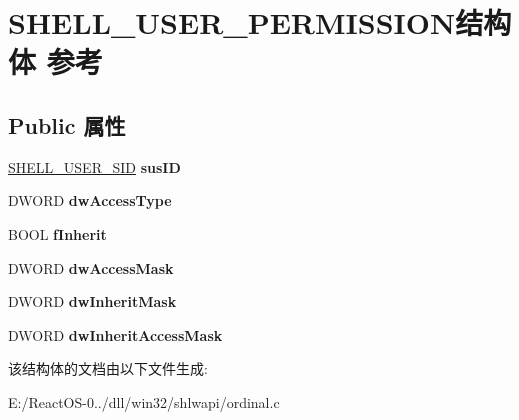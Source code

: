 \hypertarget{struct_s_h_e_l_l___u_s_e_r___p_e_r_m_i_s_s_i_o_n}{}\section{S\+H\+E\+L\+L\+\_\+\+U\+S\+E\+R\+\_\+\+P\+E\+R\+M\+I\+S\+S\+I\+O\+N结构体 参考}
\label{struct_s_h_e_l_l___u_s_e_r___p_e_r_m_i_s_s_i_o_n}
\subsection*{Public 属性}
\begin{DoxyCompactItemize}
\item 
\mbox{\label{struct_s_h_e_l_l___u_s_e_r___p_e_r_m_i_s_s_i_o_n_a40a6002cd78f67492c8f1269f8272184}} 
\hyperlink{struct_s_h_e_l_l___u_s_e_r___s_i_d}{S\+H\+E\+L\+L\+\_\+\+U\+S\+E\+R\+\_\+\+S\+ID} {\bfseries sus\+ID}
\item 
\mbox{\label{struct_s_h_e_l_l___u_s_e_r___p_e_r_m_i_s_s_i_o_n_a944d0acaee97feff1475881ed6fecabb}} 
D\+W\+O\+RD {\bfseries dw\+Access\+Type}
\item 
\mbox{\label{struct_s_h_e_l_l___u_s_e_r___p_e_r_m_i_s_s_i_o_n_ab6aa5de573f3476bb0657e1de87b7cfe}} 
B\+O\+OL {\bfseries f\+Inherit}
\item 
\mbox{\label{struct_s_h_e_l_l___u_s_e_r___p_e_r_m_i_s_s_i_o_n_a9aa1c7fde14cd2d020a1cf00d7793e46}} 
D\+W\+O\+RD {\bfseries dw\+Access\+Mask}
\item 
\mbox{\label{struct_s_h_e_l_l___u_s_e_r___p_e_r_m_i_s_s_i_o_n_aeda4602e958d9aad801fb1800e6c946e}} 
D\+W\+O\+RD {\bfseries dw\+Inherit\+Mask}
\item 
\mbox{\label{struct_s_h_e_l_l___u_s_e_r___p_e_r_m_i_s_s_i_o_n_a7295d0d325e5d101a2e2832573d8c5d9}} 
D\+W\+O\+RD {\bfseries dw\+Inherit\+Access\+Mask}
\end{DoxyCompactItemize}


该结构体的文档由以下文件生成\+:\begin{DoxyCompactItemize}
\item 
E\+:/\+React\+O\+S-\/0../dll/win32/shlwapi/ordinal.\+c\end{DoxyCompactItemize}
